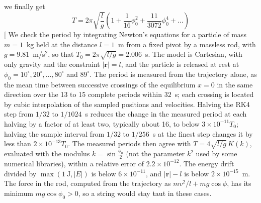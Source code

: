 \begin{problem}[title={Pendulum period as a function of amplitude}]
{\begin{equation*}
\end{equation*}
we finally get
}
{
\begin{equation*}
    T = 2\pi\sqrt{\frac{l}{g}}\left( 1 + \frac{1}{16}\phi_0^2 + \frac{11}{3072}\phi_0^4 + \ldots \right)
\end{equation*}
}
[
We check the period by integrating Newton's equations for a particle of mass $m=1$~kg held at the distance $l=1$~m from a fixed pivot by a massless rod, with $g=9.81$~m/s$^2$, so that $T_0=2\pi\sqrt{l/g}=2.006$~s. The model is Cartesian, with only gravity and the constraint $|\mathbf{r}|=l$, and the particle is released at rest at $\phi_0=10^\circ,20^\circ,\ldots,80^\circ$ and $89^\circ$. The period is measured from the trajectory alone, as the mean time between successive crossings of the equilibrium $x=0$ in the same direction over the 13 to 15 complete periods within $32$~s; each crossing is located by cubic interpolation of the sampled positions and velocities. Halving the RK4 step from $1/32$ to $1/1024$~s reduces the change in the measured period at each halving by a factor of at least two, typically about 16, to below $3\times10^{-11}T_0$; halving the sample interval from $1/32$ to $1/256$~s at the finest step changes it by less than $2\times10^{-13}T_0$. The measured periods then agree with $T=4\sqrt{l/g}\,K(k)$, evaluated with the modulus $k=\sin\frac{\phi_0}{2}$ (not the parameter $k^2$ used by some numerical libraries), within a relative error of $2.2\times10^{-12}$. The energy drift divided by $\max(1~\mathrm{J},|E|)$ is below $6\times10^{-11}$, and $|\mathbf{r}|-l$ is below $2\times10^{-15}$~m. The force in the rod, computed from the trajectory as $mv^2/l+mg\cos\phi$, has its minimum $mg\cos\phi_0>0$, so a string would stay taut in these cases.


\end{problem}
